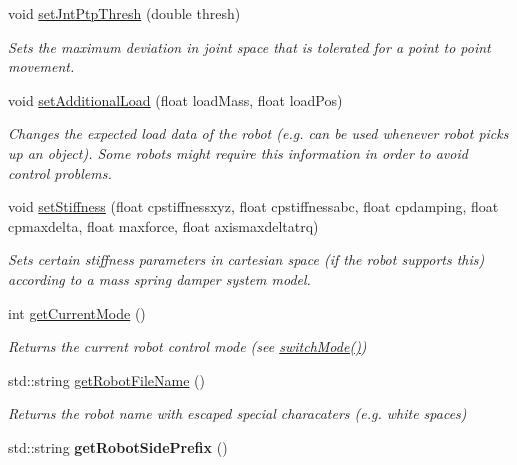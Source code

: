 \begin{DoxyCompactItemize}
\item 
void \hyperlink{classkukadu_1_1KukieControlQueue_ac6653c3a050bb338702294776b4a8065}{set\+Jnt\+Ptp\+Thresh} (double thresh)
\begin{DoxyCompactList}\small\item\em Sets the maximum deviation in joint space that is tolerated for a point to point movement. \end{DoxyCompactList}\item 
void \hyperlink{classkukadu_1_1KukieControlQueue_a0fef688170ac5a3e21df426a30ef0e77}{set\+Additional\+Load} (float load\+Mass, float load\+Pos)
\begin{DoxyCompactList}\small\item\em Changes the expected load data of the robot (e.\+g. can be used whenever robot picks up an object). Some robots might require this information in order to avoid control problems. \end{DoxyCompactList}\item 
void \hyperlink{classkukadu_1_1KukieControlQueue_a3145cfcb1dc4879e2e3f16ad4829ce09}{set\+Stiffness} (float cpstiffnessxyz, float cpstiffnessabc, float cpdamping, float cpmaxdelta, float maxforce, float axismaxdeltatrq)
\begin{DoxyCompactList}\small\item\em Sets certain stiffness parameters in cartesian space (if the robot supports this) according to a mass spring damper system model. \end{DoxyCompactList}\item 
int \hyperlink{classkukadu_1_1KukieControlQueue_aecd7cca5bf0b7dd990d061acdee56ce3}{get\+Current\+Mode} ()
\begin{DoxyCompactList}\small\item\em Returns the current robot control mode (see \hyperlink{classkukadu_1_1ControlQueue_a5defe63d9f1b9829676f9a31a4683911}{switch\+Mode()}) \end{DoxyCompactList}\item 
std\+::string \hyperlink{classkukadu_1_1KukieControlQueue_a390da7a21b5c9f42ceff914155499b76}{get\+Robot\+File\+Name} ()
\begin{DoxyCompactList}\small\item\em Returns the robot name with escaped special characaters (e.\+g. white spaces) \end{DoxyCompactList}\item 
std\+::string {\bfseries get\+Robot\+Side\+Prefix} ()\hypertarget{classkukadu_1_1KukieControlQueue_abab099320e0d9f4f6d68c784fcbfeb15}{}\label{classkukadu_1_1KukieControlQueue_abab099320e0d9f4f6d68c784fcbfeb15}


\end{DoxyCompactItemize}
